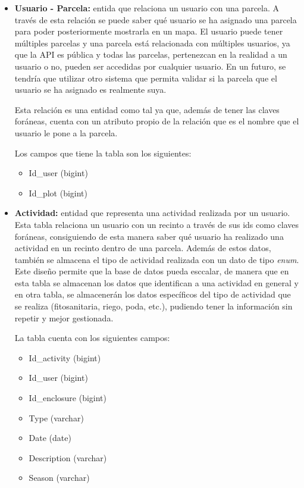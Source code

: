 \begin{itemize}
    \item \textbf{Usuario - Parcela:} entida que relaciona un usuario con una parcela. A través de esta relación se puede saber qué usuario se ha asignado una parcela para poder posteriormente 
    mostrarla en un mapa. El usuario puede tener múltiples parcelas y una parcela está relacionada con múltiples usuarios, ya que la API es pública y todas las parcelas, pertenezcan
    en la realidad a un usuario o no, pueden ser accedidas por cualquier usuario. En un futuro, se tendría que utilizar otro sistema que permita validar si la parcela que el usuario 
    se ha asignado es realmente suya.

    Esta relación es una entidad como tal ya que, además de tener las claves foráneas, cuenta con un atributo propio de la relación que es el nombre que el usuario le pone a la parcela.

    Los campos que tiene la tabla son los siguientes:

    \begin{itemize}
        \item Id\_user (bigint)
        \item Id\_plot (bigint)
    \end{itemize}

    \item \textbf{Actividad:} entidad que representa una actividad realizada por un usuario. Esta tabla relaciona un usuario con un recinto a través de sus ids como claves foráneas, consiguiendo
    de esta manera saber qué usuario ha realizado una actividad en un recinto dentro de una parcela. Además de estos datos, también se almacena el tipo de actividad realizada con un dato de tipo
    \textit{enum}. Este diseño permite que la base de datos pueda esccalar, de manera que en esta tabla se almacenan los datos que identifican a una actividad en general y en otra tabla, se 
    almacenerán los datos específicos del tipo de actividad que se realiza (fitosanitaria, riego, poda, etc.), pudiendo tener la información sin repetir y mejor gestionada.
    
    La tabla cuenta con los siguientes campos:

    \begin{itemize}
        \item Id\_activity (bigint)
        \item Id\_user (bigint)
        \item Id\_enclosure (bigint)
        \item Type (varchar)
        \item Date (date)
        \item Description (varchar)
        \item Season (varchar)
    \end{itemize}


\end{itemize}
